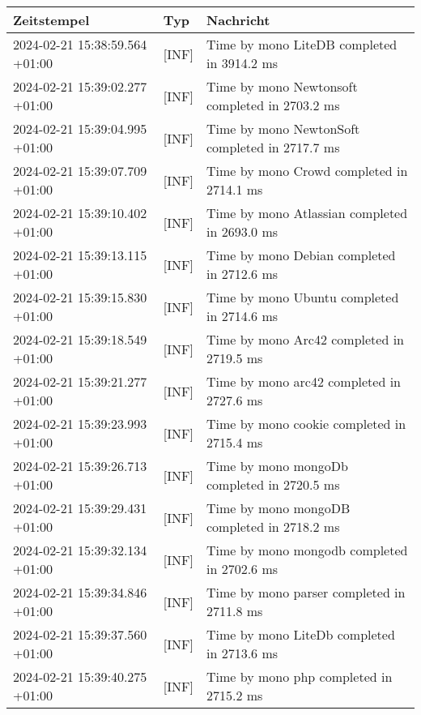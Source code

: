         {
            {\small
                \begin{tabularx}{\textwidth}{|l|l|X|}
                    \hline
                    \textbf{Zeitstempel} & \textbf{Typ} & \textbf{Nachricht} \\
                    \hline
                    \endhead
                    2024-02-21 15:38:59.564 +01:00 & [INF] & Time by mono LiteDB completed in 3914.2 ms \\
                    2024-02-21 15:39:02.277 +01:00 & [INF] & Time by mono Newtonsoft completed in 2703.2 ms \\
                    2024-02-21 15:39:04.995 +01:00 & [INF] & Time by mono NewtonSoft completed in 2717.7 ms \\
                    2024-02-21 15:39:07.709 +01:00 & [INF] & Time by mono Crowd completed in 2714.1 ms \\
                    2024-02-21 15:39:10.402 +01:00 & [INF] & Time by mono Atlassian completed in 2693.0 ms \\
                    2024-02-21 15:39:13.115 +01:00 & [INF] & Time by mono Debian completed in 2712.6 ms \\
                    2024-02-21 15:39:15.830 +01:00 & [INF] & Time by mono Ubuntu completed in 2714.6 ms \\
                    2024-02-21 15:39:18.549 +01:00 & [INF] & Time by mono Arc42 completed in 2719.5 ms \\
                    2024-02-21 15:39:21.277 +01:00 & [INF] & Time by mono arc42 completed in 2727.6 ms \\
                    2024-02-21 15:39:23.993 +01:00 & [INF] & Time by mono cookie completed in 2715.4 ms \\
                    2024-02-21 15:39:26.713 +01:00 & [INF] & Time by mono mongoDb completed in 2720.5 ms \\
                    2024-02-21 15:39:29.431 +01:00 & [INF] & Time by mono mongoDB completed in 2718.2 ms \\
                    2024-02-21 15:39:32.134 +01:00 & [INF] & Time by mono mongodb completed in 2702.6 ms \\
                    2024-02-21 15:39:34.846 +01:00 & [INF] & Time by mono parser completed in 2711.8 ms \\
                    2024-02-21 15:39:37.560 +01:00 & [INF] & Time by mono LiteDb completed in 2713.6 ms \\
                    2024-02-21 15:39:40.275 +01:00 & [INF] & Time by mono php completed in 2715.2 ms \\

\end{tabularx}}}
